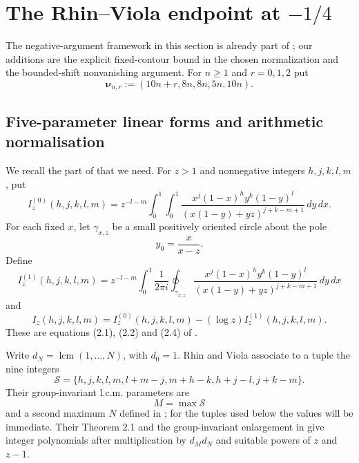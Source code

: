 \documentclass[11pt]{amsart}
\newcommand{\dd}{\,d}
\newcommand{\lcm}{\operatorname{lcm}}
\theoremstyle{plain}
\theoremstyle{remark}\newtheorem{remark}[theorem]{Remark}
\numberwithin{equation}{section}
\begin{document}
\section{The Rhin--Viola endpoint at $-1/4$}\label{sec:quarter}
The negative-argument framework in this section is already part of \cite{RV19}; our additions are the explicit fixed-contour bound in the chosen normalization and the bounded-shift nonvanishing argument.
For $n\ge1$ and $r=0,1,2$ put
\begin{equation}\label{q:eq:shifted-tuple}
  \boldsymbol\nu_{n,r}:=(10n+r,8n,8n,5n,10n).
\end{equation}
\subsection{Five-parameter linear forms and arithmetic normalisation}\label{q:sec:rv}

We recall the part of \cite{RV05} that we need.  For $z>1$ and
nonnegative integers $h,j,k,l,m$, put
\begin{equation}\label{q:eq:I0}
 I_z^{(0)}(h,j,k,l,m)
 =z^{-l-m}\int_0^1\!\int_0^1
 \frac{x^j(1-x)^h y^k(1-y)^l}
      {(x(1-y)+yz)^{j+k-m+1}}\dd y\dd x .
\end{equation}
For each fixed $x$, let $\gamma_{x,z}$ be a small positively oriented circle
about the pole
\[
  y_0=\frac{x}{x-z}.
\]
Define
\begin{equation}\label{q:eq:I1}
 I_z^{(1)}(h,j,k,l,m)
 =z^{-l-m}\int_0^1\frac{1}{2\pi i}
 \oint_{\gamma_{x,z}}
 \frac{x^j(1-x)^h y^k(1-y)^l}
      {(x(1-y)+yz)^{j+k-m+1}}\dd y\dd x
\end{equation}
and
\begin{equation}\label{q:eq:I}
  I_z(h,j,k,l,m)=I_z^{(0)}(h,j,k,l,m)
                  -(\log z)I_z^{(1)}(h,j,k,l,m).
\end{equation}
These are equations (2.1), (2.2) and (2.4) of
\cite{RV05}.

Write $d_N=\lcm(1,\ldots,N)$, with $d_0=1$.  Rhin and Viola associate to a
tuple the nine integers
\begin{equation}\label{q:eq:Sset}
 \mathcal S=\{h,j,k,l,m,l+m-j,m+h-k,h+j-l,j+k-m\}.
\end{equation}
Their group-invariant l.c.m. parameters are
\[
 M=\max\mathcal S
\]
and a second maximum $N$ defined in \cite[(4.2)]{RV05}; for the
tuples used below the values will be immediate.  Their Theorem 2.1 and the
group-invariant enlargement in \cite[\S4]{RV05} give integer
polynomials after multiplication by $d_Md_N$ and suitable powers of $z$ and
$z-1$.
\end{document}
